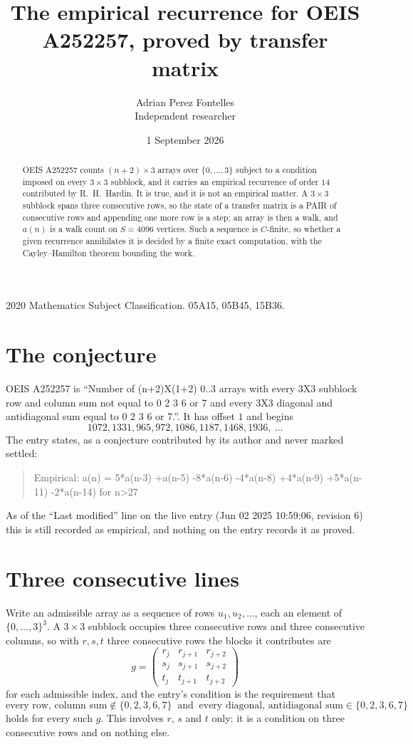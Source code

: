 \documentclass[11pt,a4paper]{article}
\title{The empirical recurrence for OEIS A252257, proved by transfer matrix}
\author{Adrian Perez Fontelles\\ \small Independent researcher}
\date{1 September 2026}
\theoremstyle{plain}
\theoremstyle{definition}
\begin{document}
\maketitle

\begin{abstract}
OEIS A252257 counts $(n+2)\times3$ arrays over $\{0,\dots,3\}$ subject to a condition imposed on
every $3\times3$ subblock, and it carries an empirical recurrence of order $14$
contributed by R.~H.~Hardin. It is true, and it is not an empirical matter. A $3\times3$
subblock spans three consecutive rows, so the state of a transfer matrix is a PAIR of
consecutive rows and appending one more row is a step; an array is then a walk, and
$a(n)$ is a walk count on $S=4096$ vertices. Such a sequence is $C$-finite, so whether a given
recurrence annihilates it is decided by a finite exact computation, with the Cayley--Hamilton
theorem bounding the work.
\end{abstract}

\noindent\small 2020 Mathematics Subject Classification. 05A15, 05B45, 15B36.\normalsize

\section{The conjecture}

OEIS A252257 is ``Number of (n+2)X(1+2) 0..3 arrays with every 3X3 subblock row and column sum not equal to 0 2 3 6 or 7 and every 3X3 diagonal and antidiagonal sum equal to 0 2 3 6 or 7.''. It has offset $1$ and begins
\[
1072, 1331, 965, 972, 1086, 1187, 1468, 1936,\ \dots
\]
The entry states, as a conjecture contributed by its author and never marked settled:
\begin{quote}
Empirical: a(n) = 5*a(n-3) +a(n-5) -8*a(n-6) -4*a(n-8) +4*a(n-9) +5*a(n-11) -2*a(n-14) for n>27
\end{quote}
As of the ``Last modified'' line on the live entry (Jun 02 2025 10:59:06, revision 6) this is still
recorded as empirical, and nothing on the entry records it as proved.

\section{Three consecutive lines}

Write an admissible array as a sequence of rows $u_1,u_2,\dots$, each an element of
$\{0,\dots,3\}^{3}$. A $3\times3$ subblock occupies three consecutive rows and
three consecutive columns, so with $r,s,t$ three consecutive rows the blocks it
contributes are
\[
g=\begin{pmatrix}r_j&r_{j+1}&r_{j+2}\\ s_j&s_{j+1}&s_{j+2}\\ t_j&t_{j+1}&t_{j+2}\end{pmatrix}
\]
for each admissible index, and the entry's condition is the requirement that
\[
\text{every row, column sum} \notin \{0,2,3,6,7\}\ \text{ and }\ \text{every diagonal, antidiagonal sum} \in \{0,2,3,6,7\}
\]
holds for every such $g$. This involves $r$, $s$ and $t$ only: it is a condition on
three consecutive rows and on nothing else.
\end{document}
